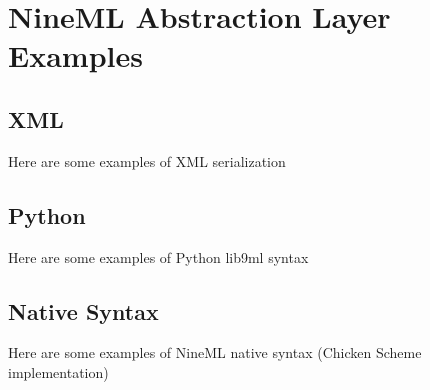 \documentclass[a4paper]{article}
\begin{document}
\section{\label{ap_examples}NineML Abstraction Layer Examples}

\subsection{XML}

Here are some examples of XML serialization


\subsection{Python}

Here are some examples of Python lib9ml syntax


\subsection{Native Syntax}

Here are some examples of NineML native syntax (Chicken Scheme implementation)


%
\end{document}
